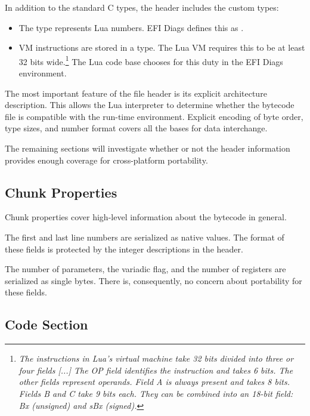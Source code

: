 	In addition to the standard C types, the header includes the custom
	types:

	\def\FnText{\textit{The instructions in Lua's virtual machine take 32
	bits divided into three or four fields [...] The OP field identifies the
	instruction and takes 6 bits. The other fields represent operands. Field
	A is always present and takes 8 bits. Fields B and C take 9 bits each.
	They can be combined into an 18-bit field: Bx (unsigned) and sBx
	(signed).} \RightLink{http://www.lua.org/doc/jucs05.pdf}}

	\begin{itemize}

		\item The  type represents Lua numbers.
		EFI Diags defines this as .

		\item VM instructions are stored in a 
		type.  The Lua VM requires this to be at least 32 bits
		wide.\footnote{\FnText} The Lua code base chooses 
		for this duty in the EFI Diags environment.

	\end{itemize}

	The most important feature of the file header is its explicit
	architecture description.  This allows the Lua interpreter to determine
	whether the bytecode file is compatible with the run-time environment.
	Explicit encoding of byte order, type sizes, and number format covers
	all the bases for data interchange.

	The remaining sections will investigate whether or not the header
	information provides enough coverage for cross-platform portability.

\subsection{Chunk Properties}

	Chunk properties cover high-level information about the bytecode in
	general.

	The first and last line numbers are serialized as native 
	values.  The format of these fields is protected by the integer
	descriptions in the header.

	The number of parameters, the variadic flag, and the number of
	registers are serialized as single bytes.  There is, consequently, no
	concern about portability for these fields.

\subsection{Code Section}

